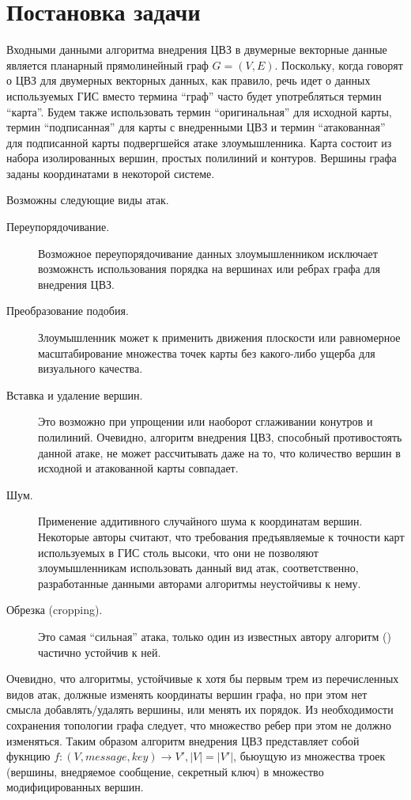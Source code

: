 \section{Постановка задачи}
\label{sec:prob_def}

Входными данными алгоритма внедрения ЦВЗ в двумерные векторные данные является планарный прямолинейный граф $G = (V, E)$. 
Поскольку, когда говорят о ЦВЗ для двумерных векторных данных, как правило, речь идет о данных используемых ГИС 
вместо термина ``граф'' часто будет употребляться термин ``карта''. Будем также использовать термин 
``оригинальная'' для исходной карты, термин ``подписанная'' для карты с внедренными ЦВЗ и термин 
``атакованная'' для подписанной карты подвергшейся атаке злоумышленника.
Карта состоит из набора изолированных вершин, простых полилиний и контуров.
Вершины графа заданы координатами в некоторой системе.

Возможны следующие виды атак.
\begin{description}
    \item[Переупорядочивание.] Возможное переупорядочивание данных злоумышленником исключает возможнсть 
    использования порядка на вершинах или ребрах графа для внедрения ЦВЗ.
    \item[Преобразование подобия.] Злоумышленник может к применить движения плоскости или 
    равномерное масштабирование множества точек карты без какого-либо ущерба для визуального качества. 
    \item[Вставка и удаление вершин.] Это возможно при упрощении или наоборот сглаживании конутров и полилиний. 
    Очевидно, алгоритм внедрения ЦВЗ, способный противостоять данной атаке, не может рассчитывать даже на то, что количество вершин в исходной и атакованной карты совпадает.
    \item[Шум.] Применение аддитивного случайного шума к координатам вершин. Некоторые авторы \cite{Kim, Shao, Bazin} считают, 
    что требования предъявляемые к точности карт используемых в ГИС столь высоки, что они не позволяют злоумышленникам использовать данный вид атак,
    соответственно, разработанные данными авторами алгоритмы неустойчивы к нему.
    \item[Обрезка (cropping).] Это самая ``сильная'' атака, только один из известных автору алгоритм (\cite{Ohbuchi}) частично устойчив к ней.
\end{description}  

Очевидно, что алгоритмы, устойчивые к хотя бы первым трем из перечисленных видов атак, должные изменять координаты вершин графа, но при этом нет смысла добавлять/удалять вершины, или менять их порядок. 
Из необходимости сохранения топологии графа следует, что множество ребер при этом не должно изменяться.
Таким образом алгоритм внедрения ЦВЗ представляет собой фукнцию $f: (V, message, key) \to V', |V| = |V'|$,
бьюущую из множества троек (вершины, внедряемое сообщение, секретный ключ) в множество модифицированных вершин.
